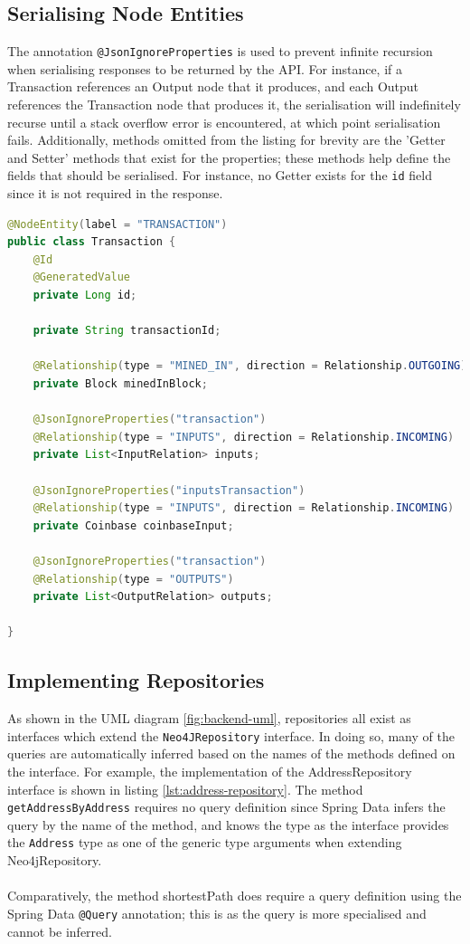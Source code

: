\subsection{Serialising Node Entities}
The annotation \texttt{@JsonIgnoreProperties} is used to prevent infinite recursion when serialising responses to be returned by the API. For instance, if a Transaction references an Output node that it produces, and each Output references the Transaction node that produces it, the serialisation will indefinitely recurse until a stack overflow error is encountered, at which point serialisation fails. Additionally, methods omitted from the listing for brevity are the 'Getter and Setter' methods that exist for the properties; these methods help define the fields that should be serialised. For instance, no Getter exists for the \texttt{id} field since it is not required in the response. 

\begin{lstlisting}[language=Java, label={lst:node-entity-transaction}, caption={A transaction node entity}, breaklines=true, basicstyle=\small]
@NodeEntity(label = "TRANSACTION")
public class Transaction {
    @Id
    @GeneratedValue
    private Long id;

    private String transactionId;

    @Relationship(type = "MINED_IN", direction = Relationship.OUTGOING)
    private Block minedInBlock;

    @JsonIgnoreProperties("transaction")
    @Relationship(type = "INPUTS", direction = Relationship.INCOMING)
    private List<InputRelation> inputs;

    @JsonIgnoreProperties("inputsTransaction")
    @Relationship(type = "INPUTS", direction = Relationship.INCOMING)
    private Coinbase coinbaseInput;

    @JsonIgnoreProperties("transaction")
    @Relationship(type = "OUTPUTS")
    private List<OutputRelation> outputs;

}
\end{lstlisting}

\subsection{Implementing Repositories}
As shown in the UML diagram \ref{fig:backend-uml}, repositories all exist as interfaces which extend the \texttt{Neo4JRepository} interface. In doing so, many of the queries are automatically inferred based on the names of the methods defined on the interface. For example, the implementation of the AddressRepository interface is shown in listing \ref{lst:address-repository}. The method \texttt{getAddressByAddress} requires no query definition since Spring Data infers the query by the name of the method, and knows the type as the interface provides the \texttt{Address} type as one of the generic type arguments when extending Neo4jRepository. 
\\\\
Comparatively, the method shortestPath does require a query definition using the Spring Data \texttt{@Query} annotation; this is as the query is more specialised and cannot be inferred.

